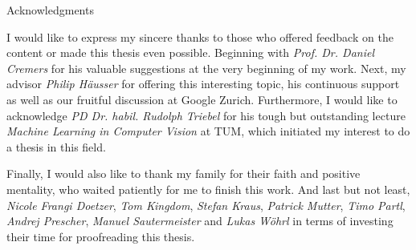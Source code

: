 \thispagestyle{empty}

\vspace*{20mm}

\begin{center}
{ Acknowledgments}
\end{center}

\vspace{10mm}

I would like to express my sincere thanks to those who offered feedback on the content or made this thesis even possible. Beginning with \textit{Prof. Dr. Daniel Cremers} for his valuable suggestions at the very beginning of my work. Next, my advisor \textit{Philip Häusser} for offering this interesting topic, his continuous support as well as our fruitful discussion at Google Zurich. Furthermore, I would like to acknowledge \textit{PD Dr. habil. Rudolph Triebel} for his tough but outstanding lecture \textit{Machine Learning in Computer Vision} at TUM, which initiated my interest to do a thesis in this field.


Finally, I would also like to thank my family for their faith and positive mentality, who waited patiently for me to finish this work. And last but not least, \textit{Nicole Frangi Doetzer}, \textit{Tom Kingdom}, \textit{Stefan Kraus}, \textit{Patrick Mutter}, \textit{Timo Partl}, \textit{Andrej Prescher}, \textit{Manuel Sautermeister} and \textit{Lukas Wöhrl} in terms of investing their time for proofreading this thesis.

\cleardoublepage{}
